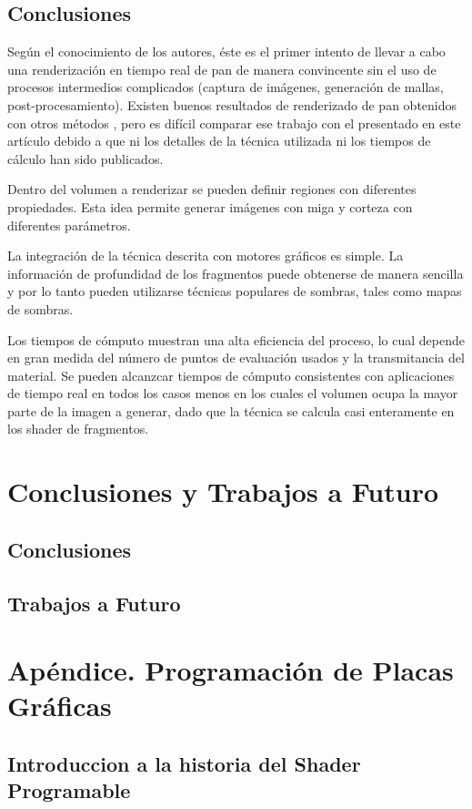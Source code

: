\documentclass[spanish,a4paper,openright,11pt]{book}
\begin{document}
\section{Conclusiones}

Según el conocimiento de los autores, éste es el primer intento de llevar a cabo una renderización en tiempo real de pan de manera convincente sin el uso de procesos intermedios complicados (captura de imágenes, generación de mallas, post-procesamiento). Existen buenos resultados de renderizado de pan obtenidos con otros métodos \cite{Cho2007}, pero es difícil comparar ese trabajo con el presentado en este artículo debido a que ni los detalles de la técnica utilizada ni los tiempos de cálculo han sido publicados.

Dentro del volumen a renderizar se pueden definir regiones con diferentes propiedades. Esta idea permite generar imágenes con miga y corteza con diferentes parámetros.

La integración de la técnica descrita con motores gráficos es simple. La información de profundidad de los fragmentos puede obtenerse de manera sencilla y por lo tanto pueden utilizarse técnicas populares de sombras, tales como mapas de sombras.

Los tiempos de cómputo muestran una alta eficiencia del proceso, lo cual depende en gran medida del número de puntos de evaluación usados y la transmitancia del material. Se pueden alcanzcar tiempos de cómputo consistentes con aplicaciones de tiempo real en todos los casos menos en los cuales el volumen ocupa la mayor parte de la imagen a generar, dado que la técnica se calcula casi enteramente en los shader de fragmentos. 

\chapter{Conclusiones y Trabajos a Futuro}
\section{Conclusiones}
\section{Trabajos a Futuro}

\chapter{Apéndice. Programación de Placas Gráficas}
\section{Introduccion a la historia del Shader Programable}
\end{document}
